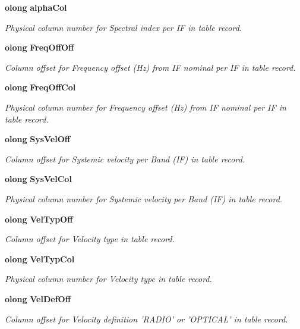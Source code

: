 \begin{CompactItemize}
{\bf olong} {\bf alpha\-Col}
\begin{CompactList}\small\item\em Physical column number for Spectral index per IF in table record. \item\end{CompactList}\item 
{\bf olong} {\bf Freq\-Off\-Off}
\begin{CompactList}\small\item\em Column offset for Frequency offset (Hz) from IF nominal per IF in table record. \item\end{CompactList}\item 
{\bf olong} {\bf Freq\-Off\-Col}
\begin{CompactList}\small\item\em Physical column number for Frequency offset (Hz) from IF nominal per IF in table record. \item\end{CompactList}\item 
{\bf olong} {\bf Sys\-Vel\-Off}
\begin{CompactList}\small\item\em Column offset for Systemic velocity per Band (IF) in table record. \item\end{CompactList}\item 
{\bf olong} {\bf Sys\-Vel\-Col}
\begin{CompactList}\small\item\em Physical column number for Systemic velocity per Band (IF) in table record. \item\end{CompactList}\item 
{\bf olong} {\bf Vel\-Typ\-Off}
\begin{CompactList}\small\item\em Column offset for Velocity type in table record. \item\end{CompactList}\item 
{\bf olong} {\bf Vel\-Typ\-Col}
\begin{CompactList}\small\item\em Physical column number for Velocity type in table record. \item\end{CompactList}\item 
{\bf olong} {\bf Vel\-Def\-Off}
\begin{CompactList}\small\item\em Column offset for Velocity definition 'RADIO' or 'OPTICAL' in table record. \item\end{CompactList}\item 

\end{CompactItemize}
